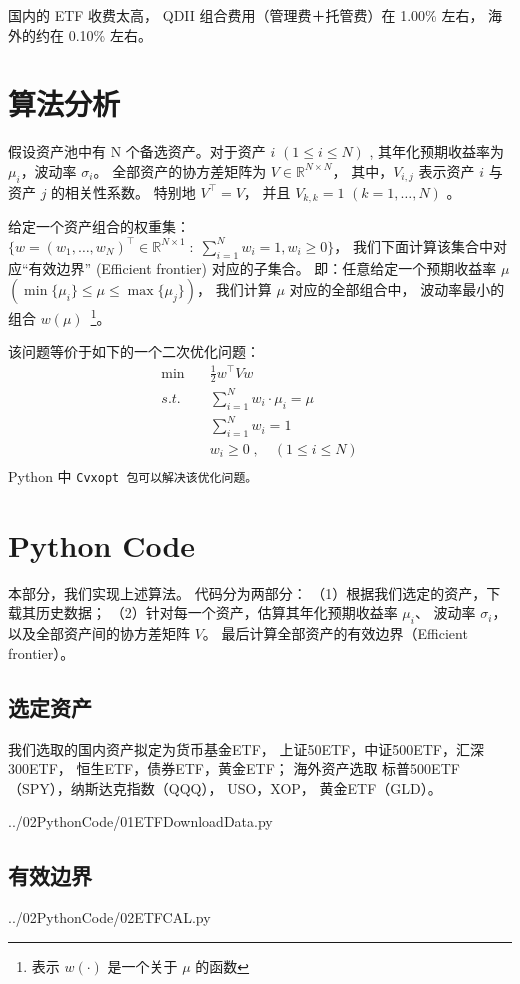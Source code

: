 \documentclass[a4paper, 11pt, UTF8]{report}
\begin{document}
国内的 ETF 收费太高，
QDII 组合费用（管理费＋托管费）在 1.00\% 左右，
海外的约在 0.10\% 左右。

\section{算法分析} 

假设资产池中有 N 个备选资产。对于资产 $i$ $(1 \le i \le N)$ ,
其年化预期收益率为$\mu_i$，波动率 $\sigma_i$。
全部资产的协方差矩阵为 $V \in \mathbb{R}^{N\times N}$，
其中，$V_{i,j}$ 表示资产 $i$ 与资产 $j$ 的相关性系数。 
特别地 $V^\top = V$，
并且 $V_{k,k} = 1$ $(k=1, \ldots, N)$ 。

给定一个资产组合的权重集：
$\{w = (w_1, \ldots, w_N)^\top \in \mathbb{R}^{N\times 1}
        \;\colon\; \sum^N_{i=1} w_i = 1, w_i \ge 0 \}$，
我们下面计算该集合中对应“有效边界” (Efficient frontier) 对应的子集合。
即：任意给定一个预期收益率 $\mu$
$( \min\{\mu_i\} \le \mu \le \max\{\mu_j\} )$，
我们计算 $\mu$ 对应的全部组合中，
波动率最小的组合
$w(\mu)$~\footnote{表示 $w(\cdot)$ 是一个关于 $\mu$ 的函数}。

该问题等价于如下的一个二次优化问题：
\begin{align*}
        \min \quad & \frac{1}{2} w^\top V w \\
        s.t.\quad  & \sum^N_{i=1} w_i \cdot \mu_i = \mu \\
                   & \sum^N_{i=1} w_i = 1 \\
                   & w_i \ge 0 \;,  \quad (1 \le i \le N) \\
\end{align*}
Python 中 \tt{Cvxopt} 包可以解决该优化问题。

\section{Python Code}
本部分，我们实现上述算法。
代码分为两部分：
（1）根据我们选定的资产，下载其历史数据；
（2）针对每一个资产，估算其年化预期收益率 $\mu_i$、
波动率 $\sigma_i$， 
以及全部资产间的协方差矩阵 $V$。
最后计算全部资产的有效边界（Efficient frontier）。

\subsection{选定资产}

我们选取的国内资产拟定为货币基金ETF，
上证50ETF，中证500ETF，汇深300ETF，
恒生ETF，债券ETF，黄金ETF；
海外资产选取
标普500ETF（SPY），纳斯达克指数（QQQ），
USO，XOP，
黄金ETF（GLD）。




                {../02PythonCode/01ETFDownloadData.py}


\newpage
\subsection{有效边界}


                {../02PythonCode/02ETFCAL.py}
\end{document}
